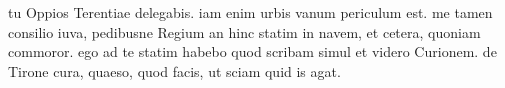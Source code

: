  tu Oppios Terentiae delegabis. iam enim urbis vanum periculum est. me tamen consilio iuva, pedibusne Regium an hinc statim in navem, et cetera, quoniam commoror. ego ad te statim habebo quod scribam simul et videro Curionem. de Tirone cura, quaeso, quod facis, ut sciam quid is agat.
